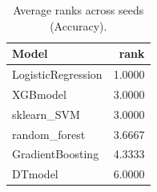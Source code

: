 \begin{table}[t]
\centering
\begin{tabular}{lr}
\toprule
Model & rank \\
\midrule
LogisticRegression & 1.0000 \\
XGBmodel & 3.0000 \\
sklearn_SVM & 3.0000 \\
random_forest & 3.6667 \\
GradientBoosting & 4.3333 \\
DTmodel & 6.0000 \\
\bottomrule
\end{tabular}
\caption{Average ranks across seeds (Accuracy).}
\label{tab:avg_rank_Accuracy}
\end{table}